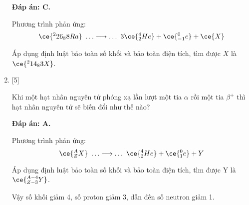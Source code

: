 \begin{enumerate}[label=\bfseries Câu \arabic*:]
	\loigiai
	{		\textbf{Đáp án: C.}
		
		Phương trình phản ứng:
		$$\ce{^226_88 Ra}\ \ldots \longrightarrow \ldots\ 3 \ce{^4_2 He} + \ce{^0_{-1} e} + \ce{X}$$
		
		Áp dụng định luật bảo toàn số khối và bảo toàn điện tích, tìm được $X$ là $\ce{^214_83 X}$.
		
	}
	\item {} [5]
	\cauhoi
	{Khi một hạt nhân nguyên tử phóng xạ lần lượt một tia $\alpha$ rồi một tia $\beta^+$ thì hạt nhân nguyên tử sẽ biến đổi như thế nào?
	}
	
	\loigiai
	{		\textbf{Đáp án: A.}
		
		Phương trình phản ứng:
		$$\ce{^A_Z X}\ \ldots \longrightarrow \ldots\ \ce{^4_2 He} + \ce{^0_1 e} + Y$$
		
		Áp dụng định luật bảo toàn số khối và bảo toàn điện tích, tìm được Y là $\ce{^{A-4}_{Z-3} Y}$.
		
		Vậy số khối giảm 4, số proton giảm 3, dẫn đến số neutron giảm 1.
		
	}
	
\end{enumerate}

